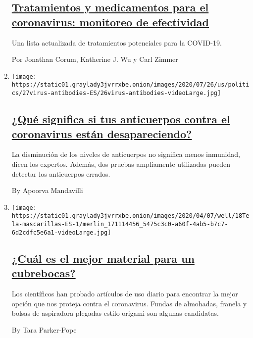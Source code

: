 \begin{enumerate}
  \hypertarget{tratamientos-y-medicamentos-para-el-coronavirus-monitoreo-de-efectividad}{%
  \subsection{\texorpdfstring{\href{/es/interactive/2020/science/coronavirus-tratamientos-curas.html}{Tratamientos
  y medicamentos para el coronavirus: monitoreo de
  efectividad}}{Tratamientos y medicamentos para el coronavirus: monitoreo de efectividad}}\label{tratamientos-y-medicamentos-para-el-coronavirus-monitoreo-de-efectividad}}

  Una lista actualizada de tratamientos potenciales para la COVID-19.

  Por Jonathan Corum, Katherine J. Wu y Carl Zimmer
\item
  \texttt{[image: https://static01.graylady3jvrrxbe.onion/images/2020/07/26/us/politics/27virus-antibodies-ES/26virus-antibodies-videoLarge.jpg]}

  \hypertarget{quuxe9-significa-si-tus-anticuerpos-contra-el-coronavirus-estuxe1n-desapareciendo}{%
  \subsection{\texorpdfstring{\href{/es/2020/07/28/espanol/ciencia-y-tecnologia/anticuerpos-coronavirus-inmunidad.html}{¿Qué
  significa si tus anticuerpos contra el coronavirus están
  desapareciendo?}}{¿Qué significa si tus anticuerpos contra el coronavirus están desapareciendo?}}\label{quuxe9-significa-si-tus-anticuerpos-contra-el-coronavirus-estuxe1n-desapareciendo}}

  La disminución de los niveles de anticuerpos no significa menos
  inmunidad, dicen los expertos. Además, dos pruebas ampliamente
  utilizadas pueden detectar los anticuerpos errados.

  By Apoorva Mandavilli
\item
  \texttt{[image: https://static01.graylady3jvrrxbe.onion/images/2020/04/07/well/18Tela-mascarillas-ES-1/merlin\_171114456\_5475c3c0-a60f-4ab5-b7c7-6d2cdfc5e6a1-videoLarge.jpg]}

  \hypertarget{cuuxe1l-es-el-mejor-material-para-un-cubrebocas}{%
  \subsection{\texorpdfstring{\href{/es/2020/04/18/espanol/material-mascarillas-virus.html}{¿Cuál
  es el mejor material para un
  cubrebocas?}}{¿Cuál es el mejor material para un cubrebocas?}}\label{cuuxe1l-es-el-mejor-material-para-un-cubrebocas}}

  Los científicos han probado artículos de uso diario para encontrar la
  mejor opción que nos proteja contra el coronavirus. Fundas de
  almohadas, franela y bolsas de aspiradora plegadas estilo origami son
  algunas candidatas.

  By Tara Parker-Pope
\end{enumerate}

